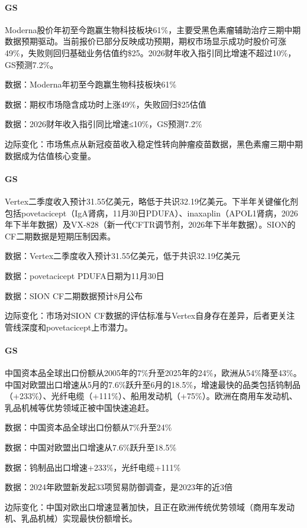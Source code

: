\documentclass[11pt]{ctexart}
\begin{document}
\paragraph{GS} Moderna股价年初至今跑赢生物科技板块61\%，主要受黑色素瘤辅助治疗三期中期数据预期驱动。当前报价已部分反映成功预期，期权市场显示成功时股价可涨49\%，失败则回归基础业务估值约\$25。2026财年收入指引同比增速不超过10\%，GS预测7.2\%。
{\small\color{refgray}数据：Moderna年初至今跑赢生物科技板块61\%\par}
{\small\color{refgray}数据：期权市场隐含成功时上涨49\%，失败回归\$25估值\par}
{\small\color{refgray}数据：2026财年收入指引同比增速≤10\%，GS预测7.2\%\par}
{\small\color{refgray}边际变化：市场焦点从新冠疫苗收入稳定性转向肿瘤疫苗数据，黑色素瘤三期中期数据成为估值核心变量。\par}
\paragraph{GS} Vertex二季度收入预计31.55亿美元，略低于共识32.19亿美元。下半年关键催化剂包括povetacicept（IgA肾病，11月30日PDUFA）、inaxaplin（APOL1肾病，2026年下半年数据）及VX-828（新一代CFTR调节剂，2026年下半年数据）。SION的CF二期数据是短期压制因素。
{\small\color{refgray}数据：Vertex二季度收入预计31.55亿美元，低于共识32.19亿美元\par}
{\small\color{refgray}数据：povetacicept PDUFA日期为11月30日\par}
{\small\color{refgray}数据：SION CF二期数据预计8月公布\par}
{\small\color{refgray}边际变化：市场对SION CF数据的评估标准与Vertex自身存在差异，后者更关注管线深度和povetacicept上市潜力。\par}
\paragraph{GS} 中国资本品全球出口份额从2005年的7\%升至2025年的24\%，欧洲从54\%降至43\%。中国对欧盟出口增速从5月的7.6\%跃升至6月的18.5\%，增速最快的品类包括钨制品（+233\%）、光纤电缆（+111\%）、船用发动机（+75\%）。欧洲在商用车发动机、乳品机械等优势领域正被中国快速追赶。
{\small\color{refgray}数据：中国资本品全球出口份额从7\%升至24\%\par}
{\small\color{refgray}数据：中国对欧盟出口增速从7.6\%跃升至18.5\%\par}
{\small\color{refgray}数据：钨制品出口增速+233\%，光纤电缆+111\%\par}
{\small\color{refgray}数据：2024年欧盟新发起33项贸易防御调查，是2023年的近3倍\par}
{\small\color{refgray}边际变化：中国对欧出口增速显著加快，且正在欧洲传统优势领域（商用车发动机、乳品机械）实现最快份额增长。\par}
\end{document}
